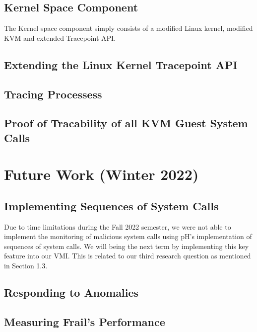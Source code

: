 \documentclass{report}
\begin{document}
\begin{spacing}{1.5}
\section{Kernel Space Component}

{\large
The Kernel space component simply consists of a modified Linux kernel, modified KVM and extended Tracepoint API.
\newline
}

\section{Extending the Linux Kernel Tracepoint API}
\section{Tracing Processess}
\section{Proof of Tracability of all KVM Guest System Calls}






\chapter{Future Work (Winter 2022)}

\section{Implementing Sequences of System Calls}

{\large
Due to time limitations during the Fall 2022 semester, we were not able to implement the monitoring of malicious system calls using pH's implementation of sequences of system calls. We will being the next term by implementing this key feature into our VMI. This is related to our third research question as mentioned in Section 1.3.
\newline
}

\section{Responding to Anomalies}



\section{Measuring Frail's Performance}


\end{spacing}
\end{document}
